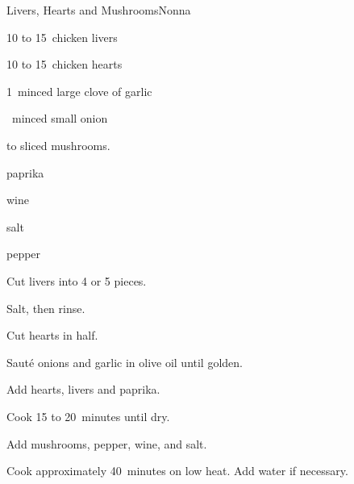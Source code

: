 \begin{recipe}{Livers, Hearts and Mushrooms}{Nonna}{}

\begin{ingredients}
\item 10 to 15~chicken livers
\item 10 to 15~chicken hearts
\item 1~minced large clove of garlic
\item \half{}~minced small onion
\item \threequarter to  sliced mushrooms.
\item \tp{\half} paprika
\item wine
\item salt
\item pepper
\end{ingredients}

\begin{directions}
\item Cut livers into 4 or 5 pieces.
\item Salt, then rinse.
\item Cut hearts in half.
\item Saut\'e onions and garlic in olive oil until golden.
\item Add hearts, livers and paprika.
\item Cook 15 to 20~minutes until dry.
\item Add mushrooms, pepper, wine, and salt.
\item Cook approximately 40~minutes on low heat. Add water if necessary.
\end{directions}

\end{recipe}
